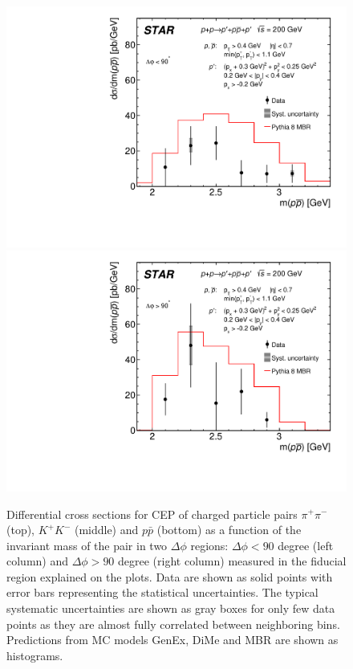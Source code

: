 \begin{figure}[h]
\hspace*{5pt}
\includegraphics[width=.46\textwidth,page=1]{graphics/physicsResults/FinalResult_InvMass_DeltaPhiBin1_proton.pdf}
\hfill
\includegraphics[width=.46\textwidth,page=1]{graphics/physicsResults/FinalResult_InvMass_DeltaPhiBin2_proton.pdf}
\hspace*{5pt}
%
\caption[Differential cross sections for CEP of charged particle pairs $\pi^+\pi^-$, $K^+K^-$ and $p\bar{p}$ as a function of the invariant mass of the pair in two $\Delta\phi$ regions: $\Delta\phi<90$ degree and $\Delta\phi>90$ degree  measured in the fiducial region explained on the plots.]{Differential cross sections for CEP of charged particle pairs $\pi^+\pi^-$ (top), $K^+K^-$ (middle) and $p\bar{p}$ (bottom) as a function of the invariant mass of the pair in two $\Delta\phi$ regions: $\Delta\phi<90$ degree (left column) and $\Delta\phi>90$ degree (right column) measured in the fiducial region explained on the plots. Data are shown as solid points with error bars representing the statistical uncertainties. The typical systematic uncertainties are shown as gray boxes for only few data points as they are almost fully correlated between neighboring bins. Predictions from MC models GenEx, DiMe and MBR are shown as histograms.}
\label{results_3}
\end{figure}




